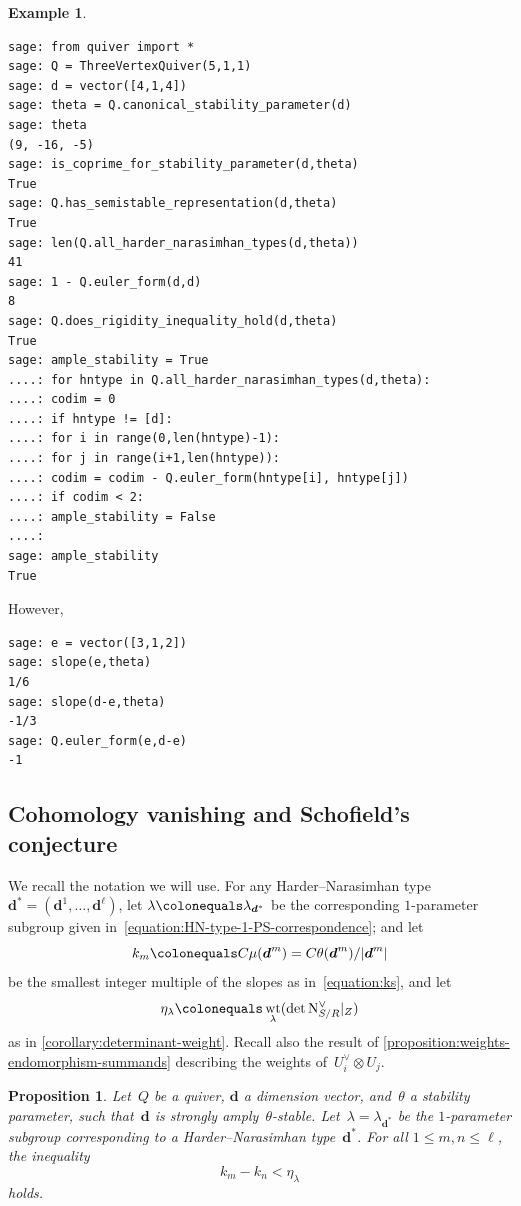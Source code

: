 \documentclass[JEP,XML,SOM,Unicode,NoEqCountersInSection,published]{cedram}
\theoremstyle{plain}
\newtheorem{proposition}[theorem]{Proposition}
\theoremstyle{definition}
\newtheorem{example}[theorem]{Example}
\DeclareMathOperator\weight{wt}
\newcommand\normal{\ensuremath{\mathrm{N}}}
\newcommand\tuple[1]{\ensuremath{{\boldsymbol{#1}}}}
\begin{document}
\begin{example}
\begin{verbatim}
sage: from quiver import *
sage: Q = ThreeVertexQuiver(5,1,1)
sage: d = vector([4,1,4])
sage: theta = Q.canonical_stability_parameter(d)
sage: theta
(9, -16, -5)
sage: is_coprime_for_stability_parameter(d,theta)
True
sage: Q.has_semistable_representation(d,theta)
True
sage: len(Q.all_harder_narasimhan_types(d,theta))
41
sage: 1 - Q.euler_form(d,d)
8
sage: Q.does_rigidity_inequality_hold(d,theta)
True
sage: ample_stability = True
....: for hntype in Q.all_harder_narasimhan_types(d,theta):
....: codim = 0
....: if hntype != [d]:
....: for i in range(0,len(hntype)-1):
....: for j in range(i+1,len(hntype)):
....: codim = codim - Q.euler_form(hntype[i], hntype[j])
....: if codim < 2:
....: ample_stability = False
....:
sage: ample_stability
True
\end{verbatim}
However,
\begin{verbatim}
sage: e = vector([3,1,2])
sage: slope(e,theta)
1/6
sage: slope(d-e,theta)
-1/3
sage: Q.euler_form(e,d-e)
-1
\end{verbatim}
\fi
\end{example}

\subsection{Cohomology vanishing and Schofield's conjecture}
\label{subsection:cohomology-vanishing}
We recall the notation we will use.
For any Harder--Narasimhan type $\tuple{d}^* = (\tuple{d}^1,\dots,\tuple{d}^\ell)$,
let $\lambda \colonequals \lambda_{\tuple{d}^*}$ be the corresponding $1$-parameter subgroup
given in~\eqref{equation:HN-type-1-PS-correspondence};
and let\vspace*{-3pt}
\begin{equation*}
k_m \colonequals C\mu(\tuple{d}^m)=C\theta(\tuple{d}^m)/\lvert\tuple{d}^m\rvert
\end{equation*}
be the smallest integer multiple of the slopes
as in~\eqref{equation:ks},
and let\vspace*{-3pt}
\begin{equation*}
\eta_\lambda\colonequals\weight_\lambda(\det\normal_{S/R}^\vee|_Z)
\end{equation*}
as in \cref{corollary:determinant-weight}.
Recall also the result of \cref{proposition:weights-endomorphism-summands}
describing the weights of~$U_i^\vee\otimes U_j$.

\begin{proposition}
\label{proposition:inequality}
Let~$Q$ be a quiver,
$\tuple{d}$ a dimension vector,
and~$\theta$ a stability parameter,
such that~$\tuple{d}$ is strongly amply~$\theta$-stable.
Let~$\lambda=\lambda_{\tuple{d}^*}$ be the $1$-parameter subgroup
corresponding to a Harder--Narasimhan type~$\tuple{d}^*$.
For all $1 \leq m,n\leq\ell$, the inequality\vspace*{-3pt}
\begin{equation}
\label{equation:teleman-inequality}
k_m-k_n<\eta_\lambda
\end{equation}
holds.
\end{proposition}
\end{document}
